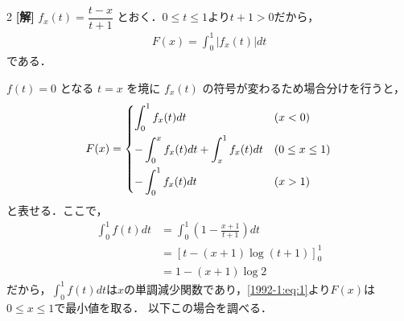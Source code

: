 \documentclass[../../main.tex]{subfiles}
\begin{document}
\setcounter{equation}{0}
\setcounter{figure}{0}
\setcounter{table}{0}
\begin{oframed}
  
\end{oframed}
\setlength{\columnseprule}{0.4pt}
\begin{multicols}{2}
  {\bf[解]}
  $f_{x}(t) = \dfrac{t-x}{t+1}$ とおく．$0\le t\le 1$より$t+1>0$だから，
  \begin{align}
    F(x) = \int_{0}^{1} \left|f_{x}(t)\right| dt
  \end{align}
  である．

  $f(t)=0$ となる $t=x$ を境に $f_{x}(t)$ の符号が変わるため場合分けを行うと，
  \begin{align}\label{1992-1:eq:1}
    F(x) =
    \begin{dcases}
      \int_{0}^{1} f_{x}(t) dt                             & (x<0)           \\
      -\int_{0}^{x} f_{x}(t) dt + \int_{x}^{1} f_{x}(t) dt & (0 \le x \le 1) \\
      -\int_{0}^{1} f_{x}(t) dt                            & (x>1)
    \end{dcases}
  \end{align}
  と表せる．ここで，
  \begin{align*}
    \int_{0}^{1} f(t) dt
     & = \int_{0}^{1} \left(1-\frac{x+1}{t+1}\right) dt \\
     & = \left[t - (x+1)\log(t+1)\right]_{0}^{1}        \\
     & = 1 - (x+1)\log 2
  \end{align*}
  だから，$\displaystyle\int_{0}^{1} f(t) dt$は$x$の単調減少関数であり，\cref{1992-1:eq:1}より$F(x)$は$0\le x \le 1$で最小値を取る．
  以下この場合を調べる．


\end{multicols}
\end{document}
